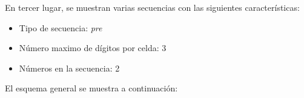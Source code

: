 \documentclass[svgnames,addpoints]{exam}
\newlength{\zerowidth}
\newlength{\zeroheight}
\begin{document}
\begin{questions}
\begin{minipage}{0.20\linewidth}
\begin{center}
\begin{tikzpicture}

      \end{tikzpicture}
    \end{center}
  \end{minipage}

  \question En tercer lugar, se muestran varias secuencias con las siguientes
  características:

  \begin{itemize}

    \item Tipo de secuencia: \textit{pre}

    \item Número maximo de dígitos por celda: 3

    \item Números en la secuencia: 2

  \end{itemize}

  El esquema general se muestra a continuación:

  \noindent\begin{minipage}{0.20\linewidth}
    \begin{center}
\end{center}
\end{minipage}
\end{questions}
\end{document}
